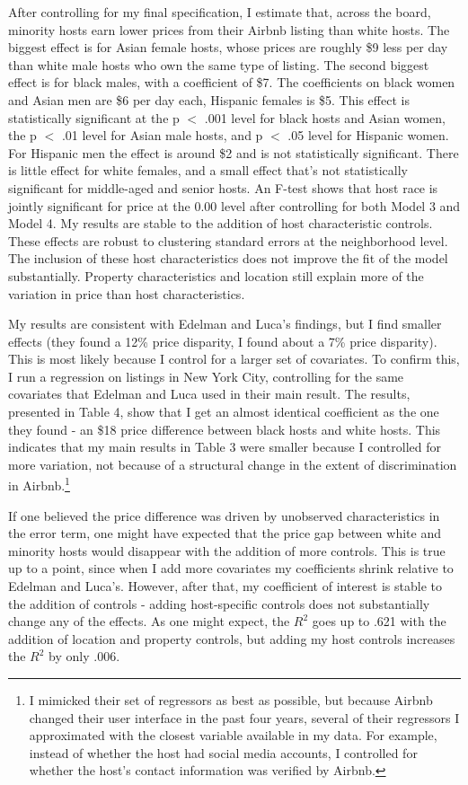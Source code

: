After controlling for my final specification, I estimate that, across the board, minority hosts earn lower prices from their Airbnb listing than white hosts. The biggest effect is for Asian female hosts, whose prices are roughly \$9 less per day than white male hosts who own the same type of listing. The second biggest effect is for black males, with a coefficient of \$7. The coefficients on black women and Asian men are \$6 per day each, Hispanic females is \$5. This effect is statistically significant at the p $<$ .001 level for black hosts and Asian women, the p $<$ .01 level for Asian male hosts, and p $<$ .05 level for Hispanic women. For Hispanic men the effect is around \$2 and is not statistically significant. There is little effect for white females, and a small effect that's not statistically significant for middle-aged and senior hosts. An F-test shows that host race is jointly significant for price at the 0.00 level after controlling for both Model 3 and Model 4. My results are stable to the addition of host characteristic controls. These effects are robust to clustering standard errors at the neighborhood level. The inclusion of these host characteristics does not improve the fit of the model substantially. Property characteristics and location still explain more of the variation in price than host characteristics. 

My results are consistent with Edelman and Luca's findings, but I find smaller effects (they found a 12\% price disparity, I found about a 7\% price disparity). This is most likely because I control for a larger set of covariates. To confirm this, I run a regression on listings in New York City, controlling for the same covariates that Edelman and Luca used in their main result. The results, presented in Table 4, show that I get an almost identical coefficient as the one they found - an \$18 price difference between black hosts and white hosts. This indicates that my main results in Table 3 were smaller because I controlled for more variation, not because of a structural change in the extent of discrimination in Airbnb.\footnote{I mimicked their set of regressors as best as possible, but because Airbnb changed their user interface in the past four years, several of their regressors I approximated with the closest variable available in my data. For example, instead of whether the host had social media accounts, I controlled for whether the host's contact information was verified by Airbnb.}

If one believed the price difference was driven by unobserved characteristics in the error term, one might have expected that the price gap between white and minority hosts would disappear with the addition of more controls. This is true up to a point, since when I add more covariates my coefficients shrink relative to Edelman and Luca's. However, after that, my coefficient of interest is stable to the addition of controls - adding host-specific controls does not substantially change any of the effects. As one might expect, the $R^2$ goes up to .621 with the addition of location and property controls, but adding my host controls increases the $R^2$ by only .006. 

